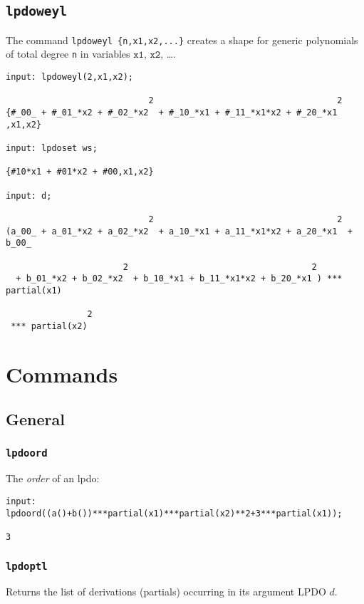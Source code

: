 \documentclass[a4paper]{article}
\begin{document}
\subsection{\texttt{lpdoweyl}}
The command \texttt{lpdoweyl \{n,x1,x2,...\}} creates a shape for
generic polynomials of total degree \texttt{n} in variables
$\texttt{x1}$, $\texttt{x2}$, \dots.

\begin{footnotesize}
\begin{verbatim}
input: lpdoweyl(2,x1,x2);

                            2                                    2
{#_00_ + #_01_*x2 + #_02_*x2  + #_10_*x1 + #_11_*x1*x2 + #_20_*x1 ,x1,x2}

input: lpdoset ws;

{#10*x1 + #01*x2 + #00,x1,x2}

input: d;

                            2                                    2
(a_00_ + a_01_*x2 + a_02_*x2  + a_10_*x1 + a_11_*x1*x2 + a_20_*x1  + b_00_

                       2                                    2
  + b_01_*x2 + b_02_*x2  + b_10_*x1 + b_11_*x1*x2 + b_20_*x1 ) *** partial(x1)

                2
 *** partial(x2)
\end{verbatim}
\end{footnotesize}

\section{Commands}

\subsection{General}
\subsubsection{\texttt{lpdoord}}
The \emph{order} of an lpdo:
\begin{footnotesize}
\begin{verbatim}
input: lpdoord((a()+b())***partial(x1)***partial(x2)**2+3***partial(x1));

3
\end{verbatim}
\end{footnotesize}
%
\subsubsection{\texttt{lpdoptl}}
Returns the list of derivations (partials) occurring in its argument
LPDO $d$.
\end{document}
